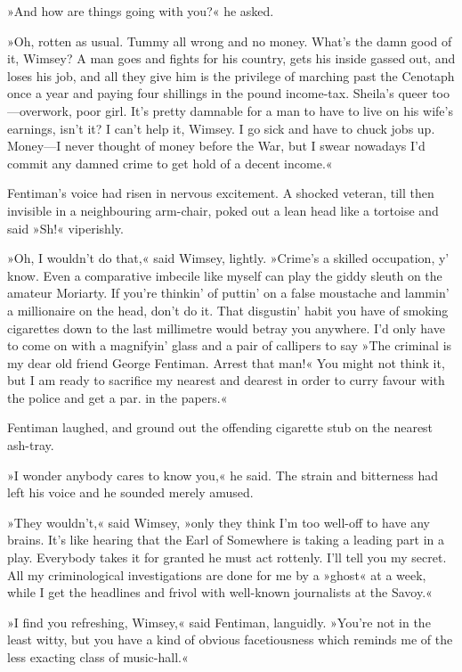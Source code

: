 »And how are things going with you?« he asked.

»Oh, rotten as usual. Tummy all wrong and no money. What's the damn good of it, Wimsey? A man goes and fights for his country, gets his inside gassed out, and loses his job, and all they give him is the privilege of marching past the Cenotaph once a year and paying four shillings in the pound income-tax. Sheila's queer too\allowbreak---\allowbreak overwork, poor girl. It's pretty damnable for a man to have to live on his wife's earnings, isn't it? I can't help it, Wimsey. I go sick and have to chuck jobs up. Money\allowbreak---\allowbreak I never thought of money before the War, but I swear nowadays I'd commit any damned crime to get hold of a decent income.«

Fentiman's voice had risen in nervous excitement. A shocked veteran, till then invisible in a neighbouring arm-chair, poked out a lean head like a tortoise and said »Sh!« viperishly.

»Oh, I wouldn't do that,« said Wimsey, lightly. »Crime's a skilled occupation, y' know. Even a comparative imbecile like myself can play the giddy sleuth on the amateur Moriarty. If you're thinkin' of puttin' on a false moustache and lammin' a millionaire on the head, don't do it. That disgustin' habit you have of smoking cigarettes down to the last millimetre would betray you anywhere. I'd only have to come on with a magnifyin' glass and a pair of callipers to say »The criminal is my dear old friend George Fentiman. Arrest that man!« You might not think it, but I am ready to sacrifice my nearest and dearest in order to curry favour with the police and get a par. in the papers.«

Fentiman laughed, and ground out the offending cigarette stub on the nearest ash-tray.

»I wonder anybody cares to know you,« he said. The strain and bitterness had left his voice and he sounded merely amused.

»They wouldn't,« said Wimsey, »only they think I'm too well-off to have any brains. It's like hearing that the Earl of Somewhere is taking a leading part in a play. Everybody takes it for granted he must act rottenly. I'll tell you my secret. All my criminological investigations are done for me by a »ghost« at  a week, while I get the headlines and frivol with well-known journalists at the Savoy.«

»I find you refreshing, Wimsey,« said Fentiman, languidly. »You're not in the least witty, but you have a kind of obvious facetiousness which reminds me of the less exacting class of music-hall.«

